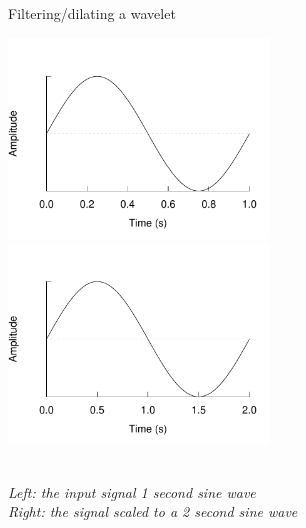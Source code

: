 \begin{figure}[h]
\caption{Filtering/dilating a wavelet}\label{figure:filtering}
\caption*{\\[1em]\emph{Left: the input signal 1 second sine wave\\ Right:
the signal scaled to a 2 second sine wave}\rm}
\centering
	\includegraphics[width=196pt]{images/sine_full.pdf}
	\hspace{1em}
	\includegraphics[width=196pt]{images/sine_scaled.pdf}
\end{figure}